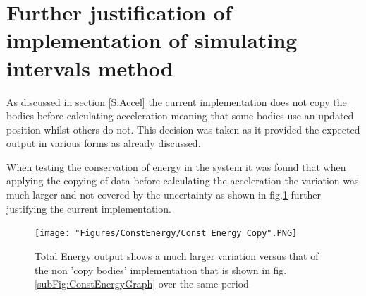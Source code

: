 \documentclass{article}
\begin{document}
    \pagebreak
    
    
    \pagebreak
    \appendix
    \section{Further justification of implementation of simulating intervals method } \label{App:FurtherImpDiscussion}
    As discussed in section \ref{S:Accel} the current implementation does not copy the bodies before 
    calculating acceleration meaning that some bodies use an updated position whilst others do not.
    This decision was taken as it provided the expected output in various forms as already discussed.
    \par
    When testing the conservation of energy in the system it was found that when applying the 
    copying of data before calculating the acceleration the variation was much larger and not 
    covered by the uncertainty as shown in fig.\ref{fig:CopyEnergyOut}  further justifying the
    current implementation.

    \begin{figure}[h]
        \centering
        \texttt{[image: "Figures/ConstEnergy/Const Energy Copy".PNG]}
        \caption{Total Energy output shows a much larger variation versus
         that of the non 'copy bodies' implementation that is shown in fig.\ref{subFig:ConstEnergyGraph} 
         over the same period}
        \label{fig:CopyEnergyOut}
    \end{figure}
\end{document}
